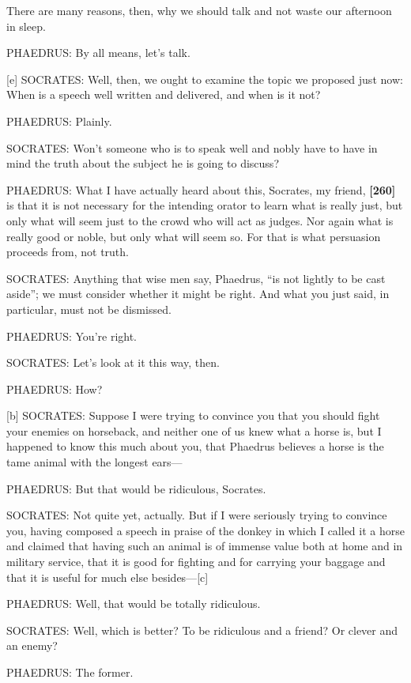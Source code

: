 There are many reasons, then, why we should talk and not waste our
afternoon in sleep.

PHAEDRUS: By all means, let's talk.

{[}e{]} SOCRATES: Well, then, we ought to examine the topic we proposed
just now: When is a speech well written and delivered, and when is it
not?

PHAEDRUS: Plainly.

SOCRATES: Won't someone who is to speak well and nobly have to have in
mind the truth about the subject he is going to discuss?

PHAEDRUS: What I have actually heard about this, Socrates, my friend,
{\bf {[}260{]}} is that it is not necessary for the intending orator to
learn what is really just, but only what will seem just to the crowd who
will act as judges. Nor again what is really good or noble, but only
what will seem so. For that is what persuasion proceeds from, not truth.

SOCRATES: Anything that wise men say, Phaedrus, “is not lightly to be
cast aside”; we must
consider whether it might be right. And what you just said, in
particular, must not be dismissed.

PHAEDRUS: You're right.

SOCRATES: Let's look at it this way, then.

PHAEDRUS: How?

{[}b{]} SOCRATES: Suppose I were trying to convince you that you should
fight your enemies on horseback, and neither one of us knew what a horse
is, but I happened to know this much about you, that Phaedrus believes a
horse is the tame animal with the longest ears---

PHAEDRUS: But that would be ridiculous, Socrates.

SOCRATES: Not quite yet, actually. But if I were seriously trying to
convince you, having composed a speech in praise of the donkey in which
I called it a horse and claimed that having such an animal is of immense
value both at home and in military service, that it is good for fighting
and for carrying your baggage and that it is useful for much else
besides---{[}c{]}

PHAEDRUS: Well, that would be totally ridiculous.

SOCRATES: Well, which is better? To be ridiculous and a friend? Or
clever and an enemy?

PHAEDRUS: The former.

